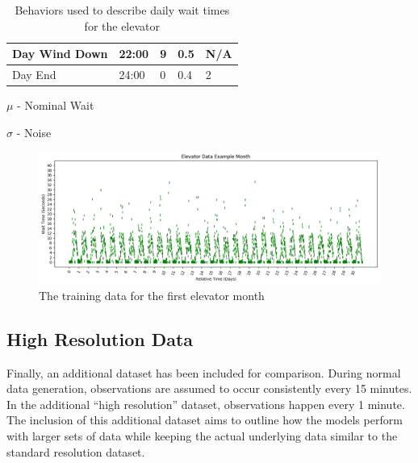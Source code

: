 \begin{table}[!htb]
\begin{tabular}{|l|l|l|l|l|}
      Day Wind Down          & 22:00    & 9                                 & 0.5                           & N/A      \\ \hline
      Day End                & 24:00    & 0                                 & 0.4                           & 2        \\ \hline
    \end{tabular}
    \begin{tablenotes}
      \small
      \item $\mu$ - Nominal Wait
      \item $\sigma$ - Noise
    \end{tablenotes}
    \caption{Behaviors used to describe daily wait times for the elevator}
    \label{table:elevator_day_t}
  \end{table}



  \begin{figure}[!htb]
    \centering
    \includegraphics[width=\linewidth]{images/Elevator_Data_Example_Month.png}
    \caption{The training data for the first elevator month}
    \label{figure:Elevator_Example_Data}
  \end{figure}


  \subsection{ High Resolution Data }

  Finally, an additional dataset has been included for comparison. During
  normal data generation, observations are assumed to occur consistently every
  15 minutes. In the additional ``high resolution'' dataset, observations happen
  every 1 minute. The inclusion of this additional dataset aims to outline how
  the models perform with larger sets of data while keeping the actual
  underlying data similar to the standard resolution dataset. \\


